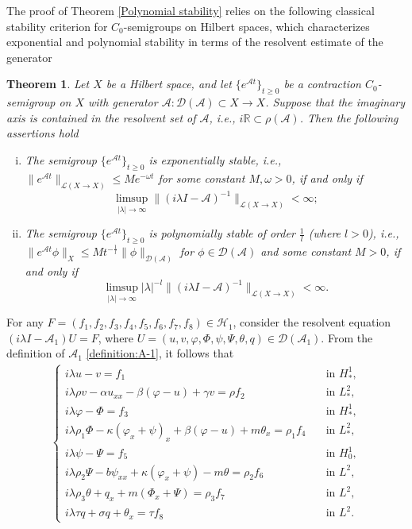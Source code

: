 \documentclass[11pt,reqno]{article}
\newtheorem{theorem}{Theorem}[section] %
\begin{document}
The proof of Theorem \ref{Polynomial stability} relies on the following classical stability criterion for \(C_0\)-semigroups on Hilbert spaces, which characterizes exponential and polynomial stability in terms of the resolvent estimate of the generator
\begin{theorem}\label{Stability Theorem}\cite{MR1681343,MR2606945}
	Let \(X\) be a Hilbert space, and let \(\{e^{\mathcal{A} t}\}_{t \geq 0}\) be a contraction \(C_0\)-semigroup on \(X\) with generator \(\mathcal{A}: \mathcal{D}(\mathcal{A}) \subset X \to X\). Suppose that the imaginary axis is contained in the resolvent set of \(\mathcal{A}\), i.e., \(i\mathbb{R} \subset \rho(\mathcal{A})\). Then the following assertions hold
	\begin{enumerate}[(i)]
		\item The semigroup \(\{e^{\mathcal{A} t}\}_{t \geq 0}\) is exponentially stable, i.e., $\|e^{\mathcal{A} t}\|_{\mathcal{L}(X \to X)} \le Me^{-\omega t}$ for some constant $M,\omega>0$, if and only if
        \[
        \limsup_{|\lambda| \to \infty} \|(i\lambda I - \mathcal{A})^{-1}\|_{\mathcal{L}(X \to X)} < \infty;
        \]
		\item  The semigroup \(\{e^{\mathcal{A} t}\}_{t \geq 0}\) is polynomially stable of order \(\frac{1}{l}\) (where \(l > 0\)), i.e., $\|e^{\mathcal{A} t}\phi\|_X\le Mt^{-\frac1l}\|\phi\|_{\mathcal{D}(\mathcal{A})}$ for $\phi\in \mathcal{D}(\mathcal{A})$ and some constant $M>0$, if and only if
        \[
        \limsup_{|\lambda| \to \infty} |\lambda|^{-l} \|(i\lambda I - \mathcal{A})^{-1}\|_{\mathcal{L}(X \to X)} < \infty.
        \]
	\end{enumerate}
\end{theorem}

  For any $F = (f_1,f_2,f_3,f_4,f_5,f_6,f_7,f_8) \in \mathcal{H}_1$, consider the resolvent equation $(i\lambda I-\mathcal{A}_1)U=F$, where $U=(u,v,\varphi,\Phi,\psi,\Psi,\theta,q) \in \mathcal{D}(\mathcal{A}_1)$. From the definition of $\mathcal{A}_1$ \eqref{definition:A-1}, it follows that
  \begin{align}\label{Resolvent equations}
  	\begin{cases}
  		i\lambda u - v=f_1   \quad &\text{in } H_*^1,\\
  		i\lambda \rho v -\alpha u_{xx}-\beta(\varphi - u)+ \gamma v =\rho f_2 \quad &\text{in } L_*^2,\\
  		i\lambda\varphi - \Phi =f_3\quad &\text{in } H_*^1,\\
  		i\lambda\rho_1 \Phi - \kappa(\varphi_{x}+\psi)_x + \beta (\varphi - u) +  m\theta_{x}=\rho_1f_4  \quad &\text{in } L_*^2,\\
  		i\lambda \psi - \Psi =f_5 \quad &\text{in } H_0^1,\\
  		i\lambda \rho_2 \Psi - b \psi_{xx} + \kappa(\varphi_{x} + \psi) - m\theta =\rho_2f_6 \quad &\text{in } L^2,\\
  		i\lambda \rho_3 \theta + q_x + m(\Phi_{x} + \Psi) =\rho_3f_7 \quad &\text{in } L^2,\\
  		i\lambda \tau q + \sigma q + \theta_x = \tau f_8 \quad &\text{in } L^2.
  	\end{cases}
  \end{align}
\end{document}
